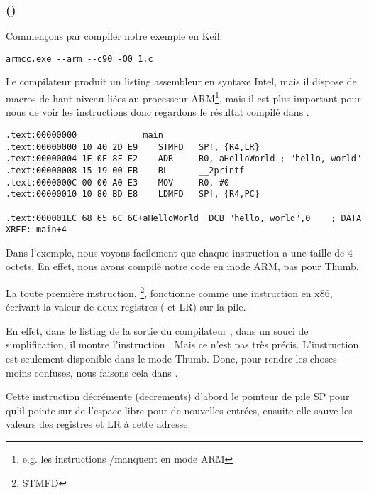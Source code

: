 \subsubsection{\NonOptimizingKeilVI (\ARMMode)}

Commençons par compiler notre exemple en Keil:

\begin{lstlisting}
armcc.exe --arm --c90 -O0 1.c 
\end{lstlisting}

\myindex{\IntelSyntax}
Le compilateur  produit un listing assembleur en syntaxe Intel, mais il dispose de macros
de haut niveau liées au processeur ARM\footnote{e.g. les instructions \PUSH/\POP manquent en mode
ARM}, mais il est plus important pour nous de voir les instructions  donc
regardons le résultat compilé dans \IDA.

\begin{lstlisting}[caption=\NonOptimizingKeilVI (\ARMMode) \IDA,style=customasmARM]
.text:00000000             main
.text:00000000 10 40 2D E9    STMFD   SP!, {R4,LR}
.text:00000004 1E 0E 8F E2    ADR     R0, aHelloWorld ; "hello, world"
.text:00000008 15 19 00 EB    BL      __2printf
.text:0000000C 00 00 A0 E3    MOV     R0, #0
.text:00000010 10 80 BD E8    LDMFD   SP!, {R4,PC}

.text:000001EC 68 65 6C 6C+aHelloWorld  DCB "hello, world",0    ; DATA XREF: main+4
\end{lstlisting}

Dans l'exemple, nous voyons facilement que chaque instruction a une taille de 4 octets.
En effet, nous avons compilé notre code en mode ARM, pas pour Thumb.

La toute première instruction, \footnote{\ac{STMFD}},
fonctionne comme une instruction \PUSH en x86, écrivant la valeur de deux registres
( et \ac{LR}) sur la pile.

En effet, dans le listing de la sortie du compilateur , dans un souci
de simplification, il montre l'instruction .
Mais ce n'est pas très précis. L'instruction \PUSH est seulement disponible dans
le mode Thumb.  Donc, pour rendre les choses moins confuses, nous faisons cela
dans \IDA.

Cette instruction décrémente (\glspl{decrement}) d'abord le pointeur de pile \ac{SP}
pour qu'il pointe sur de l'espace libre pour de nouvelles entrées, ensuite elle
sauve les valeurs des registres  et \ac{LR} à cette adresse.

